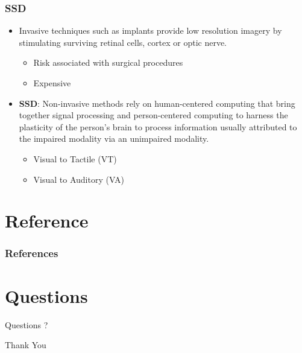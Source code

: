 \documentclass{beamer}
\begin{document}
\begin{frame}
\frametitle{SSD}
\begin{itemize}
\item
Invasive techniques such
as implants provide low resolution imagery by stimulating surviving
retinal cells, cortex or optic nerve.
\begin{itemize}
\item
Risk associated with surgical procedures
\item
Expensive
\end{itemize}
\item{\textbf{SSD}:}
Non-invasive methods rely on human-centered computing
that bring together signal processing and person-centered computing
to harness the plasticity of the person's brain to process
information usually attributed to the impaired modality via an
unimpaired modality\cite{Brown2016}.
\begin{itemize}
\item
Visual to Tactile (VT)
\item
Visual to Auditory (VA)
\end{itemize}
\end{itemize}
\end{frame}


\section{Reference}
\begin{frame}[allowframebreaks]
\frametitle{References}

%
\scriptsize{}
\nocite{*}
\end{frame}

\section{Questions}
\begin{frame}
\Huge{\centerline{Questions ?}}
\end{frame}
\begin{frame}
\Huge{\centerline{Thank You}}
\end{frame}

\end{document}
